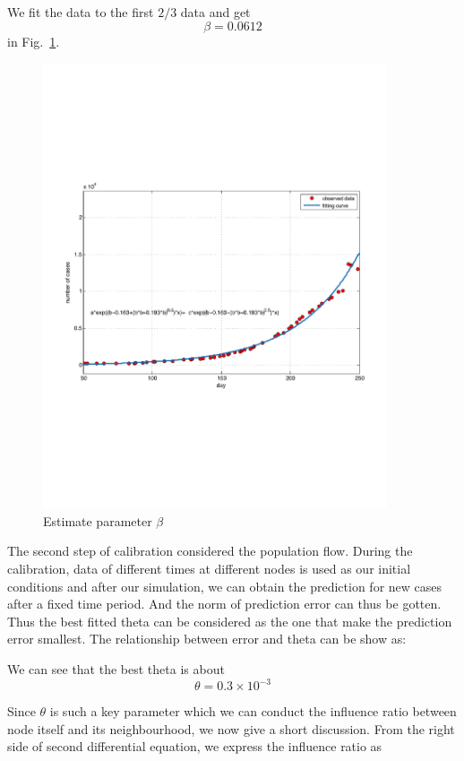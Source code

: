 \documentclass[11pt]{article}
\begin{document}
We fit the data to the first $2/3$ data and get $$\beta = 0.0612$$ in Fig.~\ref{cfit}.

\begin{figure}[hbtp]
\begin{center}
  \includegraphics[width=4in]{graph/cfit.pdf}
  \caption{Estimate parameter $\beta$ }
  \label{cfit}
\end{center}  
\end{figure}




The second step of calibration considered the population flow. During the calibration, data of different times at different nodes is used as our initial conditions and after our simulation, we can obtain the prediction for new cases after a fixed time period. And the norm of prediction error can thus be gotten. Thus the best fitted theta can be considered as the one that make the prediction error smallest. The relationship between error and theta can be show as:

We can see that the best theta is about $$\theta = 0.3 \times 10^{-3}$$

Since $\theta$ is such a key parameter which we can conduct the influence ratio between node itself and its neighbourhood, we now give a short discussion. From the right side of second differential equation, we express the influence ratio as
\end{document}
